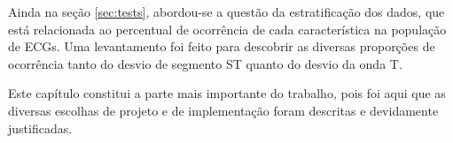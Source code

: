 Ainda na seção \ref{sec:tests}, abordou-se a questão da estratificação dos dados, que está relacionada ao percentual de ocorrência de cada característica na população de ECGs. Uma levantamento foi feito para descobrir as diversas proporções de ocorrência tanto do desvio de segmento ST quanto do desvio da onda T.

Este capítulo constitui a parte mais importante do trabalho, pois foi aqui que as diversas escolhas de projeto e de implementação foram descritas e devidamente justificadas.